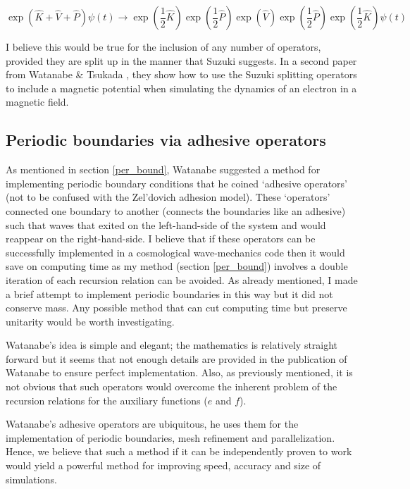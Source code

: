 \begin{equation}
\exp(\hat{K}+\hat{V}+\hat{P})\psi(t)\rightarrow  \exp(\frac{1}{2}\hat{K})\exp(\frac{1}{2}\hat{P})\exp(\hat{V}) \exp(\frac{1}{2}\hat{P})\exp(\frac{1}{2}\hat{K}) \psi(t)
\end{equation}

\noindent I believe this would be true for the inclusion of any number of operators, provided they are split up in the manner that Suzuki suggests. In a second paper from Watanabe \& Tsukada \citep{bib_wat2}, they show how to use the Suzuki splitting operators to include a magnetic potential when simulating the dynamics of an electron in a magnetic field.

\subsection{Periodic boundaries via adhesive operators}
As mentioned in section \ref{per_bound}, Watanabe \citep{bib_wat} suggested a method for implementing periodic boundary conditions that he coined `adhesive operators' (not to be confused with the Zel'dovich adhesion model). These `operators' connected one boundary to another (connects the boundaries like an adhesive) such that waves that exited on the left-hand-side of the system and would reappear on the right-hand-side. I believe that if these operators can be successfully implemented in a cosmological wave-mechanics code then it would save on computing time as my method (section \ref{per_bound}) involves a double iteration of each recursion relation can be avoided. As already mentioned, I made a brief attempt to implement periodic boundaries in this way but it did not conserve mass. Any possible method that can cut computing time but preserve unitarity would be worth investigating.

Watanabe's idea is simple and elegant; the mathematics is relatively straight forward but it seems that not enough details are provided in the publication of Watanabe to ensure perfect implementation. Also, as previously mentioned, it is not obvious that such operators would overcome the inherent problem of the recursion relations for the auxiliary functions ($e$ and $f$).

Watanabe's adhesive operators are ubiquitous, he uses them for the implementation of periodic boundaries, mesh refinement and parallelization. Hence, we believe that such a method if it can be independently proven to work would yield a powerful method for improving speed, accuracy and size of simulations.

